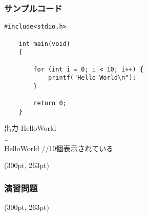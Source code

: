 \documentclass[dvipdfmx]{beamer}
\begin{document}
\begin{frame}[t, fragile, label=27]
    \frametitle{サンプルコード}
    \vspace{-20pt}
    \begin{lstlisting}[gobble=4, caption=pra\_ for.c, label=pra-for]
    #include<stdio.h>

    int main(void)
    {

        for (int i = 0; i < 10; i++) {
            printf("Hello World\n"); 
        }

        return 0;
    }
    \end{lstlisting}
    \begin{block}{出力}
    Hello\space World\\
    \dots\\
    Hello\space World //10個表示されている
    \end{block}
    \begin{textblock*}{0.3\linewidth}(300pt, 263pt)
    \hyperlink{26}{}
    \space
    \hyperlink{28}{}
    \end{textblock*}
\end{frame}

\begin{frame}[t, fragile, label=28]
    \frametitle{演習問題}
    \begin{textblock*}{0.3\linewidth}(300pt, 263pt)
    \hyperlink{27}{}
    \space
    \hyperlink{29}{}
    \end{textblock*}
\end{frame}
\end{document}
